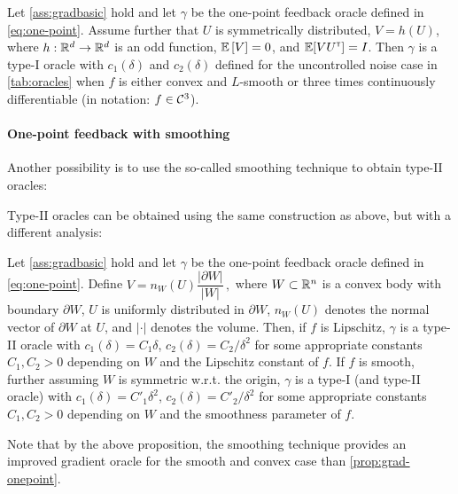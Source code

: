 \begin{proposition}
\label{prop:grad-onepoint}
Let \cref{ass:gradbasic} hold and let $\gamma$ be the one-point feedback oracle defined in \eqref{eq:one-point}.
Assume further that
  $U$ is symmetrically distributed,
  $V = h(U)$, where $h:\mathbb{R}^d \to \mathbb{R}^d$ is an odd function,
  $\mathbb{E}\left[V\right]=0$, and $\mathbb{E}[V U^\mathsf{\scriptscriptstyle T}] = I$.
Then $\gamma$ is a type-I oracle with $c_1(\delta)$ and $c_2(\delta)$ defined for the uncontrolled noise case in \cref{tab:oracles}
when $f$ is either convex and $L$-smooth or three times continuously differentiable (in notation: $f \in \mathcal{C}^3$).
\end{proposition}

\paragraph{One-point feedback with smoothing}
Another possibility is to use the so-called smoothing technique
\citep{PoTsy90,flaxman2005online,HaLe14:SOC}
to obtain type-II oracles:


Type-II oracles can be obtained using the same construction as above, but with a different analysis:
\begin{proposition}
\label{prop:flaxman} Let \cref{ass:gradbasic} hold and let $\gamma$ be the one-point feedback oracle defined in \eqref{eq:one-point}.
Define
$
V = n_W(U)\dfrac{\lvert \partial W\rvert}{\lvert W \rvert}\,,
$
where $W \subset \mathbb{R}^n$ is a convex body with boundary $\partial W$, $U$ is uniformly distributed in $\partial W$, $n_W(U)$ denotes the normal vector of $\partial W$ at $U$, and $\lvert \cdot \rvert$ denotes the volume.
Then, if $f$ is Lipschitz, $\gamma$ is a type-II oracle with $c_1(\delta)=C_1 \delta$, $c_2(\delta) = C_2/\delta^2$ for some appropriate constants $C_1,C_2>0$ depending on $W$ and the Lipschitz constant of $f$.
If $f$ is smooth, further assuming $W$ is symmetric w.r.t. the origin, $\gamma$ is a type-I (and type-II oracle) with $c_1(\delta) = C'_1\delta^2$, $c_2(\delta) = C'_2/\delta^2$ for some appropriate constants $C_1,C_2>0$ depending on $W$ and the smoothness parameter of $f$.
\end{proposition}
Note that by the above proposition, the smoothing technique provides an improved gradient oracle for the smooth and convex case than \cref{prop:grad-onepoint}.



